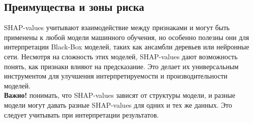 \subsection*{Преимущества и зоны риска}
SHAP-values учитывают взаимодействие между признаками и могут быть применены к любой модели машинного обучения, но особенно полезны они для интерпретации Black-Box моделей, таких как ансамбли деревьев или нейронные сети. Несмотря на сложность этих моделей, SHAP-values дают возможность понять, как признаки влияют на предсказание. Это делает их универсальным инструментом для улучшения интерпретируемости и производительности моделей.\\
\textbf{Важно!} понимать, что SHAP-values зависят от структуры модели, и разные модели могут давать разные SHAP-values для одних и тех же данных. Это следует учитывать при интерпретации результатов.

